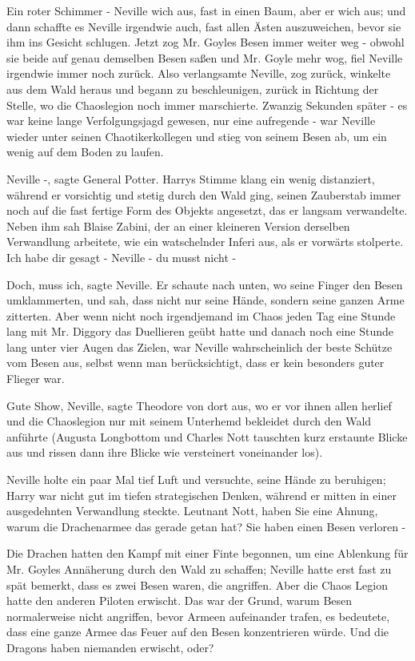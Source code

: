 Ein roter Schimmer - Neville wich aus, fast in einen Baum, aber er wich aus; und
dann schaffte es Neville irgendwie auch, fast allen Ästen auszuweichen, bevor
sie ihm ins Gesicht schlugen. Jetzt zog Mr. Goyles Besen immer weiter weg -
obwohl sie beide auf genau demselben Besen saßen und Mr. Goyle mehr wog, fiel
Neville irgendwie immer noch zurück. Also verlangsamte Neville, zog zurück,
winkelte aus dem Wald heraus und begann zu beschleunigen, zurück in Richtung der
Stelle, wo die Chaoslegion noch immer marschierte. Zwanzig Sekunden später - es
war keine lange Verfolgungsjagd gewesen, nur eine aufregende - war Neville
wieder unter seinen Chaotikerkollegen und stieg von seinem Besen ab, um ein
wenig auf dem Boden zu laufen.

\glqq{}Neville -\grqq{}, sagte General Potter. Harrys Stimme klang ein wenig
distanziert, während er vorsichtig und stetig durch den Wald ging, seinen
Zauberstab immer noch auf die fast fertige Form des Objekts angesetzt, das er
langsam verwandelte. Neben ihm sah Blaise Zabini, der an einer kleineren Version
derselben Verwandlung arbeitete, wie ein watschelnder Inferi aus, als er
vorwärts stolperte. \glqq{}Ich habe dir gesagt - Neville - du musst nicht
-\grqq{}

\glqq{}Doch, muss ich\grqq{}, sagte Neville. Er schaute nach unten, wo seine
Finger den Besen umklammerten, und sah, dass nicht nur seine Hände, sondern
seine ganzen Arme zitterten. Aber wenn nicht noch irgendjemand im Chaos jeden
Tag eine Stunde lang mit Mr. Diggory das Duellieren geübt hatte und danach noch
eine Stunde lang unter vier Augen das Zielen, war Neville wahrscheinlich der
beste Schütze vom Besen aus, selbst wenn man berücksichtigt, dass er kein
besonders guter Flieger war.

\glqq{}Gute Show, Neville\grqq{}, sagte Theodore von dort aus, wo er vor ihnen
allen herlief und die Chaoslegion nur mit seinem Unterhemd bekleidet durch den
Wald anführte (Augusta Longbottom und Charles Nott tauschten kurz erstaunte
Blicke aus und rissen dann ihre Blicke wie versteinert voneinander los).

Neville holte ein paar Mal tief Luft und versuchte, seine Hände zu beruhigen;
Harry war nicht gut im tiefen strategischen Denken, während er mitten in einer
ausgedehnten Verwandlung steckte. \glqq{}Leutnant Nott, haben Sie eine Ahnung,
warum die Drachenarmee das gerade getan hat? Sie haben einen Besen verloren
-\grqq{}

Die Drachen hatten den Kampf mit einer Finte begonnen, um eine Ablenkung für Mr.
Goyles Annäherung durch den Wald zu schaffen; Neville hatte erst fast zu spät
bemerkt, dass es zwei Besen waren, die angriffen. Aber die Chaos Legion hatte
den anderen Piloten erwischt. Das war der Grund, warum Besen normalerweise nicht
angriffen, bevor Armeen aufeinander trafen, es bedeutete, dass eine ganze Armee
das Feuer auf den Besen konzentrieren würde. \glqq{}Und die Dragons haben
niemanden erwischt, oder?\grqq{}


